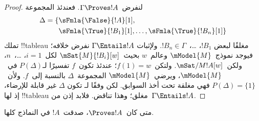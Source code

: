 \documentclass[../../../include/open-logic-section]{subfiles}
\begin{document}
\begin{proof}
  لنفرض~$\Gamma \Proves !A$. فعندئذ المجموعة
  \begin{align*}
    \Delta = \{&\sFmla{\False}{!A}[1],\\
    &\sFmla{\True}{!B_1}[1], \dots, \sFmla{\True}{!B_n}[1]\}
  \end{align*}
  تملك !!{tableau} مغلقًا لبعض
  $!B_1$، \dots،~$!B_n \in \Gamma$. ولإثبات
  $\Gamma \Entails !A$ نفرض خلافه؛ فيوجد نموذج~$\mModel{M}$
  وعالم~$w$ بحيث~$\mSat{M}{!B_i}[w]$ لكل~$i=1$، \dots،~$n$،
  ولكن~$\mSat/{M}{!A}[w]$. ولتكن~$f(1) = w$؛ عندئذ تكون~$f$ تفسيرًا
  لـ$P(\Delta)$ في~$\mModel{M}$، ويرضي~$\mModel{M}$ المجموعة~$\Delta$
  بالنسبة إلى~$f$. ولأن~$P(\Delta)=\{1\}$ فهي مغلقة تحت أخذ السوابق.
  لكن وفقًا لـ تكون
  $\Delta$ غير قابلة للإرضاء، إذ لها !!{tableau} مغلق؛ وهذا تناقض.
  فلابد إذن من~$\Gamma \Entails !A$.
\end{proof}

\begin{cor}
متى كان~$\Proves !A$، صدقت~$!A$ في النماذج كلها.
\end{cor}
\end{document}
